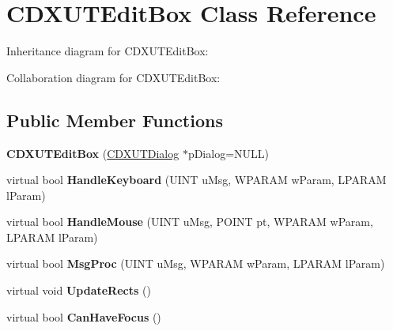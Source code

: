 \hypertarget{class_c_d_x_u_t_edit_box}{\section{C\+D\+X\+U\+T\+Edit\+Box Class Reference}
\label{class_c_d_x_u_t_edit_box}
}


Inheritance diagram for C\+D\+X\+U\+T\+Edit\+Box\+:


Collaboration diagram for C\+D\+X\+U\+T\+Edit\+Box\+:
\subsection*{Public Member Functions}
\begin{DoxyCompactItemize}
\item 
\hypertarget{class_c_d_x_u_t_edit_box_ad2626863f3d8863dc7d4107e7282db55}{{\bfseries C\+D\+X\+U\+T\+Edit\+Box} (\hyperlink{class_c_d_x_u_t_dialog}{C\+D\+X\+U\+T\+Dialog} $\ast$p\+Dialog=N\+U\+L\+L)}\label{class_c_d_x_u_t_edit_box_ad2626863f3d8863dc7d4107e7282db55}

\item 
\hypertarget{class_c_d_x_u_t_edit_box_a579bcc8298d08c9d52fbf917fa046442}{virtual bool {\bfseries Handle\+Keyboard} (U\+I\+N\+T u\+Msg, W\+P\+A\+R\+A\+M w\+Param, L\+P\+A\+R\+A\+M l\+Param)}\label{class_c_d_x_u_t_edit_box_a579bcc8298d08c9d52fbf917fa046442}

\item 
\hypertarget{class_c_d_x_u_t_edit_box_afadff4a882c187926a7b8173eb7d97cc}{virtual bool {\bfseries Handle\+Mouse} (U\+I\+N\+T u\+Msg, P\+O\+I\+N\+T pt, W\+P\+A\+R\+A\+M w\+Param, L\+P\+A\+R\+A\+M l\+Param)}\label{class_c_d_x_u_t_edit_box_afadff4a882c187926a7b8173eb7d97cc}

\item 
\hypertarget{class_c_d_x_u_t_edit_box_adca915977ba1b8019594ef5d350ed03e}{virtual bool {\bfseries Msg\+Proc} (U\+I\+N\+T u\+Msg, W\+P\+A\+R\+A\+M w\+Param, L\+P\+A\+R\+A\+M l\+Param)}\label{class_c_d_x_u_t_edit_box_adca915977ba1b8019594ef5d350ed03e}

\item 
\hypertarget{class_c_d_x_u_t_edit_box_a86b6a5f6a509b4bc15f2edd8926718d5}{virtual void {\bfseries Update\+Rects} ()}\label{class_c_d_x_u_t_edit_box_a86b6a5f6a509b4bc15f2edd8926718d5}

\item 
\hypertarget{class_c_d_x_u_t_edit_box_a988225899327c419d70d013ed6ab113a}{virtual bool {\bfseries Can\+Have\+Focus} ()}\label{class_c_d_x_u_t_edit_box_a988225899327c419d70d013ed6ab113a}


\end{DoxyCompactItemize}
